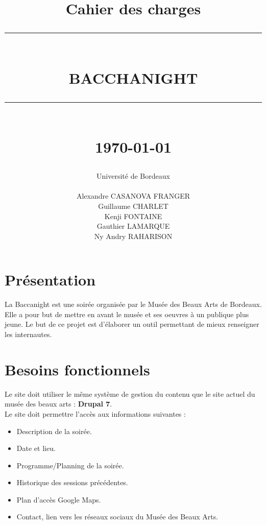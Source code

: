 \documentclass[11pt]{report}
\newcommand{\HRule}[1]{\rule{\linewidth}{#1}}
\renewcommand{\thesection}{\arabic{section}}
\begin{document}
\title
{
	\Large{Cahier des charges}
	\HRule{2pt} \\ [0.5cm]
	\LARGE \textbf{\uppercase{Bacchanight}}
	\HRule{2pt} \\ [0.5cm]
	\normalsize \today
}

\date{}

\author
{
	\LARGE{Université de Bordeaux} \\
	\\
	Alexandre CASANOVA FRANGER \\
	Guillaume CHARLET \\
    Kenji FONTAINE \\
    Gauthier LAMARQUE \\
	Ny Andry RAHARISON \\
}

\maketitle


\renewcommand{\thesection}{\arabic{section}}

\section{Présentation}

La Baccanight est une soirée organisée par le Musée des Beaux Arts de Bordeaux.
Elle a pour but de mettre en avant le musée et ses oeuvres à un publique plus jeune.
Le but de ce projet est d'élaborer un outil permettant de mieux renseigner les internautes.

\section{Besoins fonctionnels}

Le site doit utiliser le même système de gestion du contenu que le site actuel
du musée des beaux arts : \textbf{Drupal 7}. \\

Le site doit permettre l'accès aux informations suivantes :
\begin{itemize}
	\item Description de la soirée.
	\item Date et lieu.
	\item Programme/Planning de la soirée.
	\item Historique des sessions précédentes.
	\item Plan d'accès Google Maps.
	\item Contact, lien vers les réseaux sociaux du Musée des Beaux Arts.
\end{itemize}
\end{document}
